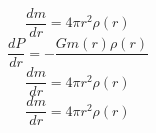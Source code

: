 \begin{equation}
    \frac{dm}{dr} = 4\pi r^2 \rho(r)
\end{equation}
\begin{equation}
    \frac{dP}{dr} = -\frac{G m(r)\rho(r)}{}
\end{equation}
\begin{equation}
    \frac{dm}{dr} = 4\pi r^2 \rho(r)
\end{equation}
\begin{equation}
    \frac{dm}{dr} = 4\pi r^2 \rho(r)
\end{equation}